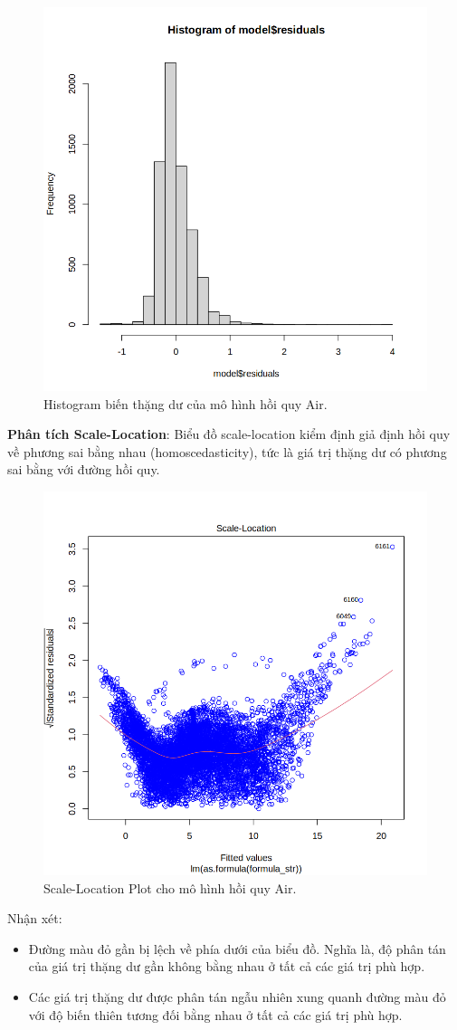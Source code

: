 \begin{figure}[H]
    \centering
    \includegraphics[width=0.75\columnwidth]{air_figures/best_model_air_histogram_residual.png}
    \caption{Histogram biến thặng dư của mô hình hồi quy Air.}
    \label{fig:best_model_air_histogram_residual}
\end{figure}

\textbf{Phân tích Scale-Location}: Biểu đồ scale-location kiểm định giả định hồi quy về phương sai bằng nhau (homoscedasticity), tức là giá trị thặng dư có phương sai bằng với đường hồi quy.

\begin{figure}[H]
    \centering
    \includegraphics[width=0.75\columnwidth]{air_figures/best_model_air_scale.png}
    \caption{Scale-Location Plot cho mô hình hồi quy Air.}
    \label{fig:best_model_air_scale}
\end{figure}
Nhận xét:
\begin{itemize}
    \item Đường màu đỏ gần bị lệch về phía dưới của biểu đồ. Nghĩa là, độ phân tán của giá trị thặng dư gần không bằng nhau ở tất cả các giá trị phù hợp. 
    \item  Các giá trị thặng dư được phân tán ngẫu nhiên xung quanh đường màu đỏ với độ biến thiên tương đối bằng nhau ở tất cả các giá trị phù hợp.
\end{itemize}

